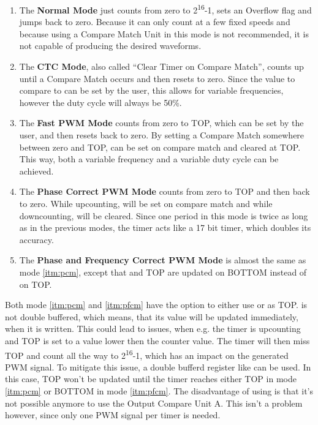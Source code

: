 \begin{enumerate}
    \item The \textbf{Normal Mode} just counts from zero to 2\textsuperscript{16}-1, sets an Overflow flag and jumps back to zero. Because it can only count at a few fixed speeds and because using a Compare Match Unit in this mode is not recommended, it is not capable of producing the desired waveforms.
    \item The \textbf{CTC Mode}, also called \enquote{Clear Timer on Compare Match}, counts up until a Compare Match occurs and then resets to zero. Since the value to compare to can be set by the user, this allows for variable frequencies, however the duty cycle will always be 50\%.
    \item The \textbf{Fast PWM Mode} counts from zero to TOP, which can be set by the user, and then resets back to zero. By setting a Compare Match somewhere between zero and TOP,  can be set on compare match and cleared at TOP. This way, both a variable frequency and a variable duty cycle can be achieved.\label{itm:fpm}
    \item The \textbf{Phase Correct PWM Mode} counts from zero to TOP and then back to zero. While upcounting,  will be set on compare match and while downcounting,  will be cleared. Since one period in this mode is twice as long as in the previous modes, the timer acts like a 17 bit timer, which doubles its accuracy.\label{itm:pcm} %
    \item The \textbf{Phase and Frequency Correct PWM Mode} is almost the same as mode \ref{itm:pcm}, except that  and TOP are updated on BOTTOM instead of on TOP.\label{itm:pfcm}
\end{enumerate}

Both mode \ref{itm:pcm} and \ref{itm:pfcm} have the option to either use  or  as TOP.  is not double buffered, which means, that its value will be updated immediately, when it is written. This could lead to issues, when e.g. the timer is upcounting and TOP is set to a value lower then the counter value. The timer will then miss TOP and count all the way to 2\textsuperscript{16}-1, which has an impact on the generated PWM signal. To mitigate this issue, a double bufferd register like  can be used. In this case, TOP won't be updated until the timer reaches either TOP in mode \ref{itm:pcm} or BOTTOM in mode \ref{itm:pfcm}. The disadvantage of using  is that it's not possible anymore to use the Output Compare Unit A. This isn't a problem however, since only one PWM signal per timer is needed.

